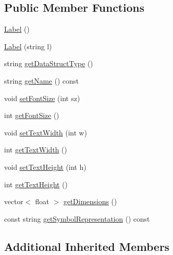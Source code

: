 \subsection*{Public Member Functions}
\begin{DoxyCompactItemize}
\item 
\mbox{\hyperlink{classbridges_1_1datastructure_1_1_label_abd73b3f555e6de007b7cb82cdf7c57cd}{Label}} ()
\item 
\mbox{\hyperlink{classbridges_1_1datastructure_1_1_label_a2eacf0820ea29c309f4910db5756607c}{Label}} (string l)
\item 
string \mbox{\hyperlink{classbridges_1_1datastructure_1_1_label_a55ccc4e52bd1f09c55ba6b775e7768ab}{get\+Data\+Struct\+Type}} ()
\item 
string \mbox{\hyperlink{classbridges_1_1datastructure_1_1_label_ac2a15e34404b9b7859e658da63a7020f}{get\+Name}} () const
\item 
void \mbox{\hyperlink{classbridges_1_1datastructure_1_1_label_aee5cc86a51a237c87e56db8e02d271b1}{set\+Font\+Size}} (int sz)
\item 
int \mbox{\hyperlink{classbridges_1_1datastructure_1_1_label_a200cc9710f28af2e63738d5166eaa51f}{get\+Font\+Size}} ()
\item 
void \mbox{\hyperlink{classbridges_1_1datastructure_1_1_label_a323af06f4536c644d6cc265b332b6ad0}{set\+Text\+Width}} (int w)
\item 
int \mbox{\hyperlink{classbridges_1_1datastructure_1_1_label_ab97fecf82c0c21f870f4dc25b6244099}{get\+Text\+Width}} ()
\item 
void \mbox{\hyperlink{classbridges_1_1datastructure_1_1_label_acd095180b94bad422f7c26182680a958}{set\+Text\+Height}} (int h)
\item 
int \mbox{\hyperlink{classbridges_1_1datastructure_1_1_label_aeaf64e048094d69e11e77563c598a045}{get\+Text\+Height}} ()
\item 
vector$<$ float $>$ \mbox{\hyperlink{classbridges_1_1datastructure_1_1_label_ac8f5e0d05c8f4466b3bf07e1fa342091}{get\+Dimensions}} ()
\item 
const string \mbox{\hyperlink{classbridges_1_1datastructure_1_1_label_aa3b7c9e5630ecc8a2534e6db2a220e90}{get\+Symbol\+Representation}} () const
\end{DoxyCompactItemize}
\subsection*{Additional Inherited Members}


